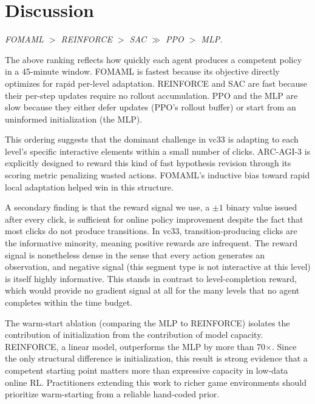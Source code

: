 \documentclass{article}
\begin{document}

\section{Discussion}
\emph{FOMAML $>$ REINFORCE $>$ SAC $\gg$ PPO $>$ MLP.}

The above ranking reflects how quickly each agent produces a competent policy in a 45-minute window. FOMAML is fastest because its objective directly optimizes for rapid per-level adaptation. REINFORCE and SAC are fast because their per-step updates require no rollout accumulation. PPO and the MLP are slow because they either defer updates (PPO's rollout buffer) or start from an uninformed initialization (the MLP).

This ordering suggests that the dominant challenge in vc33 is adapting to each level's specific interactive elements within a small number of clicks. ARC-AGI-3 is explicitly designed to reward this kind of fast hypothesis revision through its scoring metric penalizing wasted actions. FOMAML's inductive bias toward rapid local adaptation helped win in this structure.

A secondary finding is that the reward signal we use, a $\pm 1$ binary value issued after every click, is sufficient for online policy improvement despite the fact that most clicks do not produce transitions. In vc33, transition-producing clicks are the informative minority, meaning positive rewards are infrequent. The reward signal is nonetheless dense in the sense that every action generates an observation, and negative signal (this segment type is not interactive at this level) is itself highly informative. This stands in contrast to level-completion reward, which would provide no gradient signal at all for the many levels that no agent completes within the time budget.

The warm-start ablation (comparing the MLP to REINFORCE) isolates the contribution of initialization from the contribution of model capacity. REINFORCE, a linear model, outperforms the MLP by more than 70$\times$. Since the only structural difference is initialization, this result is strong evidence that a competent starting point matters more than expressive capacity in low-data online RL. Practitioners extending this work to richer game environments should prioritize warm-starting from a reliable hand-coded prior.
\end{document}
